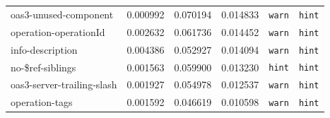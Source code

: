 {\begin{longtable}{lrrrrr}
oas3-unused-component &  0.000992 &  0.070194 & 0.014833 & \texttt{warn} & \texttt{hint} \\
operation-operationId &  0.002632 &  0.061736 & 0.014452 & \texttt{warn} & \texttt{hint} \\
info-description & 0.004386 &  0.052927 & 0.014094 & \texttt{warn} & \texttt{hint} \\
no-\$ref-siblings &  0.001563 &  0.059900 & 0.013230 & \texttt{hint} & \texttt{hint} \\
oas3-server-trailing-slash & 0.001927 &  0.054978 & 0.012537 & \texttt{warn} & \texttt{hint} \\
operation-tags & 0.001592 &  0.046619 & 0.010598 & \texttt{warn} & \texttt{hint} \\ 
\hline\hline
\end{longtable}
}

